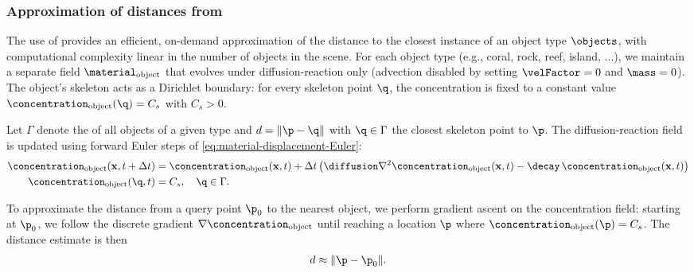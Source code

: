 \subsubsection{Approximation of distances from }

The use of  provides an efficient, on-demand approximation of the distance to the closest instance of an object type $\objects$, with computational complexity linear in the number of objects in the scene. For each object type (e.g., coral, rock, reef, island, ...), we maintain a separate  field $\material_\text{object}$ that evolves under diffusion-reaction only (advection disabled by setting $\velFactor = 0$ and $\mass = 0$). The object's skeleton acts as a Dirichlet boundary: for every skeleton point $\q$, the concentration is fixed to a constant value $\concentration_\text{object}(\q) = C_s$ with $C_s > 0$. 

Let $\Gamma$ denote the  of all objects of a given type and $d = \|\p - \q\|$ with $\q \in \Gamma$ the closest skeleton point to $\p$. The diffusion-reaction field is updated using forward Euler steps of \eqref{eq:material-displacement-Euler}:
\begin{align}
    \concentration_\text{object}(\mathbf x,t+\Delta t)
    &=\concentration_\text{object}(\mathbf x,t)
      + \Delta t \left(\diffusion\nabla^2 \concentration_\text{object}(\mathbf x,t)
      - \decay\,\concentration_\text{object}(\mathbf x,t)\right) \\
    \concentration_\text{object}(\q,t) &= C_s, \quad \q \in \Gamma.
\end{align}

To approximate the distance from a query point $\p_0$ to the nearest object, we perform gradient ascent on the concentration field: starting at $\p_0$, we follow the discrete gradient $\nabla \concentration_\text{object}$ until reaching a location $\p$ where $\concentration_\text{object}(\p)=C_s$. The distance estimate is then
\begin{align}
    d \approx \|\p-\p_0\|.
\end{align}

